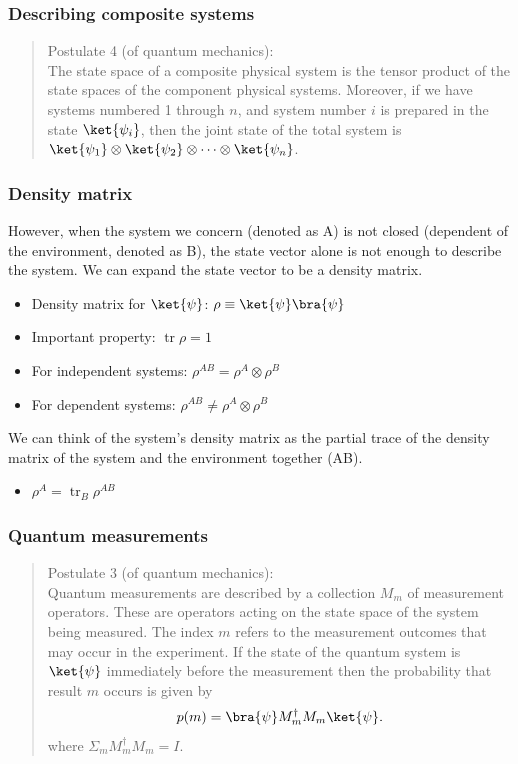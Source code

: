 \documentclass{beamer}
\begin{document}
\begin{frame}
    \frametitle{Describing composite systems}
    \cite{qcqi}
    \begin{quote}
        Postulate 4 (of quantum mechanics):\\
        The state space of a composite physical system is the tensor product
        of the state spaces of the component physical systems.
        Moreover, if we have systems numbered 1 through $n$, and system number
        $i$ is prepared in the state
        $\ket{\psi_{i}}$, then the joint state of the total system is
        $\ket{\psi_{1}} \otimes \ket{\psi_{2}} \otimes \dots \otimes \ket{\psi_{n}}$.
    \end{quote}
\end{frame}

\begin{frame}
    \frametitle{Density matrix}
    However, when the system we concern (denoted as A) is not closed (dependent of the
    environment, denoted as B), the state vector alone is not enough to describe the system.
    We can expand the state vector to be a density matrix.
    \begin{itemize}
        \item Density matrix for $\ket{\psi}$: $\rho \equiv \ket{\psi}\bra{\psi}$
        \item Important property: $\operatorname{tr}\rho = 1$
        \item For independent systems: $\rho^{AB} = \rho^{A} \otimes \rho^{B}$
        \item For dependent systems: $\rho^{AB} \neq \rho^{A} \otimes \rho^{B}$
    \end{itemize}
    We can think of the system's density matrix as the partial trace
    of the density matrix of the system and the environment together (AB).
    \begin{itemize}
        \item $\rho^{A} = \operatorname{tr}_{B}\rho^{AB}$
    \end{itemize}
\end{frame}

\begin{frame}
    \frametitle{Quantum measurements}
    \cite{qcqi}
    \begin{quote}
        Postulate 3 (of quantum mechanics):\\
        Quantum measurements are described by a collection ${M_{m}}$ of
        measurement operators. These are operators acting on the state space of the
        system being measured. The index $m$ refers to the measurement outcomes that
        may occur in the experiment. If the state of the quantum system is $\ket{\psi}$
        immediately before the measurement then the probability that result $m$ occurs is
        given by
        \begin{align}
            p(m) = \bra{\psi} M_{m}^{\dagger} M_{m}\ket{\psi}.
        \end{align}
        where $\Sigma_{m} M_{m}^{\dagger} M_{m} = I$.
    \end{quote}
\end{frame}
\end{document}
